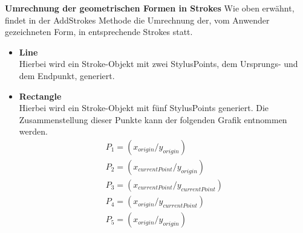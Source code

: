 \textbf{Umrechnung der geometrischen Formen in Strokes}
Wie oben erwähnt, findet in der AddStrokes Methode die Umrechnung der, vom Anwender gezeichneten Form, in entsprechende Strokes statt. 
\begin{itemize}
\item \textbf{Line}\\ 
Hierbei wird ein Stroke-Objekt mit zwei StylusPoints, dem Ursprungs- und dem Endpunkt, generiert.
\item \textbf{Rectangle}\\ 
Hierbei wird ein Stroke-Objekt mit fünf StylusPoints generiert. Die Zusammenstellung dieser Punkte kann der folgenden Grafik entnommen werden.
\begin{align}
P_1 = (x_{origin} / y_{origin})\\
P_2 = (x_{currentPoint} / y_{origin})\\
P_3 = (x_{currentPoint} / y_{currentPoint})\\
P_4 = (x_{origin} / y_{currentPoint})\\
P_5 = (x_{origin} / y_{origin})
\end{align}


\end{itemize}
